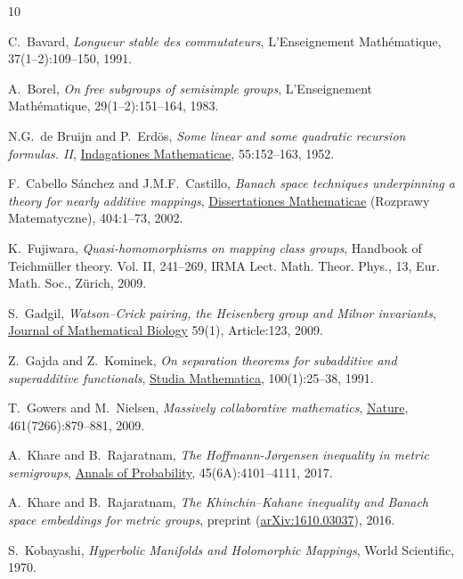 \documentclass[11pt,a4paper,reqno]{amsart}
\numberwithin{equation}{section}
\theoremstyle{plain}
\theoremstyle{definition}
\begin{document}
\begin{thebibliography}{10}

C.~Bavard, {\em Longueur stable des commutateurs}, L'Enseignement
  Math\'ematique, 37(1--2):109--150, 1991.

A.~Borel, \emph{On free subgroups of semisimple groups}, L'Enseignement
  Math\'ematique, 29(1--2):151--164, 1983.

N.G.~de Bruijn and P.~Erd\"os, {\em Some linear and some quadratic
  recursion formulas. II},
  \href{http://dx.doi.org/10.1016/S1385-7258(52)50021-0}{Indagationes
  Mathematicae}, 55:152--163, 1952.

F.~Cabello S\'anchez and J.M.F.~Castillo, {\em Banach space techniques
  underpinning a theory for nearly additive mappings},
  \href{https://www.impan.pl/en/publishing-house/journals-and-series/dissertationes-mathematicae/all/404}{Dissertationes
  Mathematicae} (Rozprawy Matematyczne), 404:1--73, 2002.

K.~Fujiwara, {\em Quasi-homomorphisms on mapping class groups},
Handbook of Teichm\"uller theory. Vol. II, 241--269,
IRMA Lect. Math. Theor. Phys., 13, Eur. Math. Soc., Z\"urich, 2009.

S.~Gadgil, {\em Watson--Crick pairing, the Heisenberg group and Milnor
  invariants}, \href{http://dx.doi.org/10.1007/s00285-008-0223-x}{Journal
  of Mathematical Biology} 59(1), Article:123, 2009.
	
Z.~Gajda and Z.~Kominek, {\em On separation theorems for subadditive and
  superadditive functionals},
  \href{http://pldml.icm.edu.pl/pldml/element/bwmeta1.element.bwnjournal-article-smv100i1p25bwm}{Studia
  Mathematica}, 100(1):25--38, 1991.

T.~Gowers and M.~Nielsen, {\em Massively collaborative mathematics},
  \href{https://www.nature.com/articles/461879a}{Nature},
  461(7266):879--881, 2009.

A.~Khare and B.~Rajaratnam, {\em The Hoffmann-J{\o}rgensen inequality in
  metric semigroups}, \href{http://dx.doi.org/10.1214/16-AOP1160}{Annals
  of Probability}, 45(6A):4101--4111, 2017.

A.~Khare and B.~Rajaratnam, {\em The Khinchin--Kahane inequality and
  Banach space embeddings for metric groups}, preprint
  (\href{http://arxiv.org/abs/1610.03037}{arXiv:1610.03037}), 2016.

S.~Kobayashi, {\em Hyperbolic Manifolds and Holomorphic Mappings},
World Scientific, 1970.


\end{thebibliography}
\end{document}
